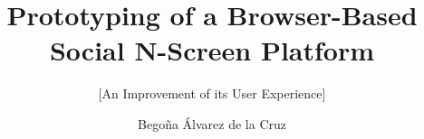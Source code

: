 \documentclass{acm_proc_article-sp}
\begin{document}
\title{Prototyping of a Browser-Based Social N-Screen Platform}
\subtitle{[An Improvement of its User Experience]
}
%
%
%
%
%

%
\author{
%
%
\alignauthor
Bego\~na \'Alvarez de la Cruz\\
       \\
       \\
       \\
}
\end{document}
